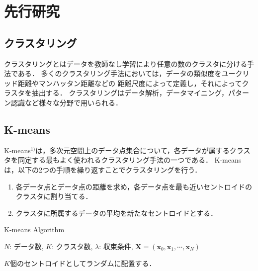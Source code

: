 \section{先行研究}

\subsection{クラスタリング}
クラスタリングとはデータを教師なし学習により任意の数のクラスタに分ける手法である．
多くのクラスタリング手法においては，データの類似度をユークリッド距離やマンハッタン距離などの
距離尺度によって定義し，それによってクラスタを抽出する．
クラスタリングはデータ解析，データマイニング，パターン認識など様々な分野で用いられる．

\subsection{K-means}
K-means$^{1)}$は，多次元空間上のデータ点集合について，各データが属するクラスタを同定する最もよく使われるクラスタリング手法の一つである．
K-meansは，以下の2つの手順を繰り返すことでクラスタリングを行う．
\begin{enumerate}
  \item 各データ点とデータ点の距離を求め，各データ点を最も近いセントロイドのクラスタに割り当てる．
  \item クラスタに所属するデータの平均を新たなセントロイドとする．
\end{enumerate}

\begin{algorithm}
  \caption{K-means Algorithm}
  \label{alg:k-means}
  \begin{algorithmic}
    \REQUIRE
      $N$: データ数, $K$: クラスタ数, $\lambda$: 収束条件,
      ${\bm X} = ({\bm x_0}, {\bm x_1}, \cdots, {\bm x_N})$

    $K$個のセントロイドとしてランダムに配置する．
  \end{algorithmic}
\end{algorithm}


